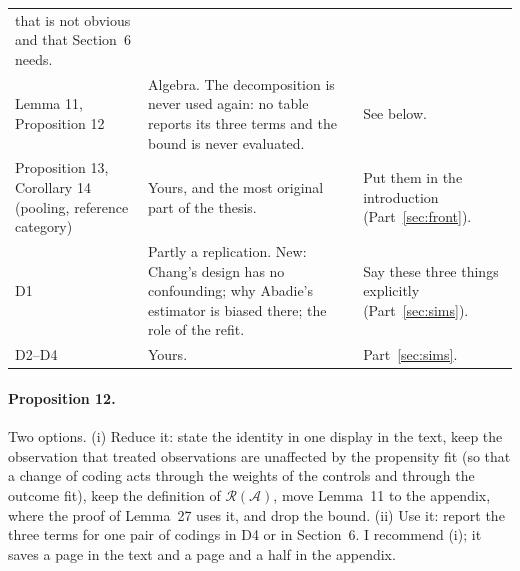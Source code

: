 \documentclass[11pt]{article}
\theoremstyle{plain}
\theoremstyle{remark}
\begin{document}
\begin{center}
\begin{tabular}{p{}p{}p{}}
  that is not obvious and that Section~6 needs.\\
Lemma 11, Proposition 12 & Algebra. The decomposition is never used again: no
  table reports its three terms and the bound is never evaluated. & See below.\\
Proposition 13, Corollary 14 (pooling, reference category) & Yours, and the most
  original part of the thesis. & Put them in the introduction (Part~\ref{sec:front}).\\
D1 & Partly a replication. New: Chang's design has no confounding; why Abadie's
  estimator is biased there; the role of the refit. & Say these three things
  explicitly (Part~\ref{sec:sims}).\\
D2--D4 & Yours. & Part~\ref{sec:sims}.\\
\bottomrule
\end{tabular}
\end{center}

\paragraph{Proposition 12.} Two options. (i) Reduce it: state the identity in
one display in the text, keep the observation that treated observations are
unaffected by the propensity fit (so that a change of coding acts through the
weights of the controls and through the outcome fit), keep the definition of
$\mathcal R(\mathcal A)$, move Lemma~11 to the appendix, where the proof of
Lemma~27 uses it, and drop the bound. (ii) Use it: report the three terms for
one pair of codings in D4 or in Section~6. I recommend (i); it saves a page in
the text and a page and a half in the appendix.
\end{document}
